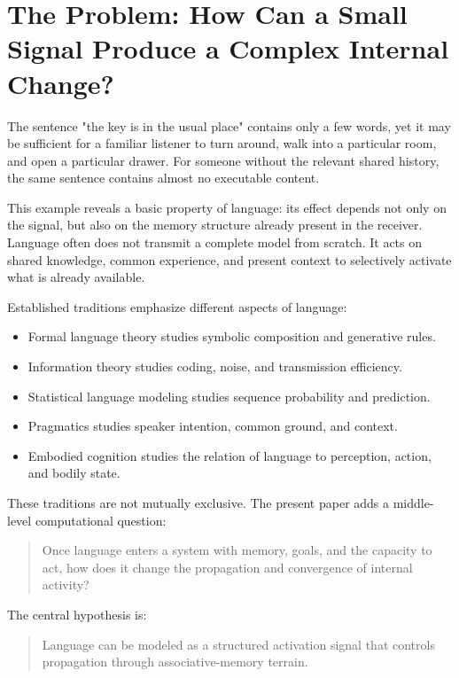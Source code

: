 \documentclass[11pt, a4paper]{article}
\begin{document}
\section{The Problem: How Can a Small Signal Produce a Complex Internal Change?}


The sentence "the key is in the usual place" contains only a few words, yet it may be sufficient for a familiar listener to turn around, walk into a particular room, and open a particular drawer. For someone without the relevant shared history, the same sentence contains almost no executable content.


This example reveals a basic property of language: its effect depends not only on the signal, but also on the memory structure already present in the receiver. Language often does not transmit a complete model from scratch. It acts on shared knowledge, common experience, and present context to selectively activate what is already available.


Established traditions emphasize different aspects of language:


\begin{itemize}
\item Formal language theory studies symbolic composition and generative rules.
\item Information theory studies coding, noise, and transmission efficiency.
\item Statistical language modeling studies sequence probability and prediction.
\item Pragmatics studies speaker intention, common ground, and context.
\item Embodied cognition studies the relation of language to perception, action, and bodily state.
\end{itemize}


These traditions are not mutually exclusive. The present paper adds a middle-level computational question:


\begin{quote}
Once language enters a system with memory, goals, and the capacity to act, how does it change the propagation and convergence of internal activity?
\end{quote}


The central hypothesis is:


\begin{quote}
Language can be modeled as a structured activation signal that controls propagation through associative-memory terrain.
\end{quote}
\end{document}
